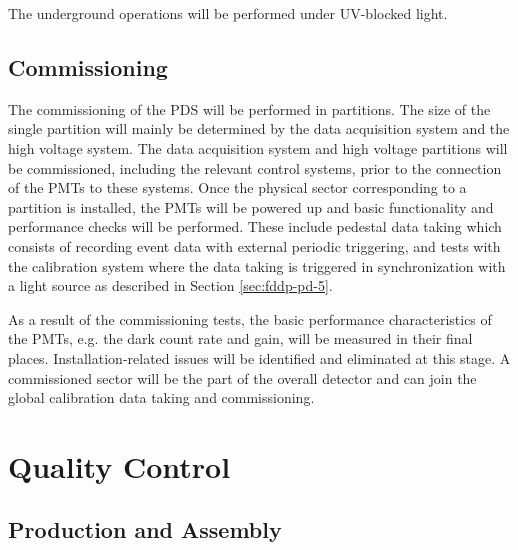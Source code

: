 The underground operations will be performed under UV-blocked light.

\subsection{Commissioning}
\label{sec:fddp-pd-9.4}

The commissioning of the PDS will be performed in partitions. The size of the single partition will mainly be determined by the data acquisition system and the high voltage system. The data acquisition system and high voltage partitions will be commissioned, including the relevant control systems, prior to the connection of the PMTs to these systems. Once the physical sector corresponding to a partition is installed, the PMTs will be powered up and basic functionality and performance checks will be performed. These include pedestal data taking which consists of recording event data with external periodic triggering, and tests with the calibration system where the data taking is triggered in synchronization with a light source as described in Section \ref{sec:fddp-pd-5}.

As a result of the commissioning tests, the basic performance characteristics of the PMTs, e.g. the dark count rate and gain, will be measured in their final places. Installation-related issues will be identified and eliminated at this stage. A commissioned sector will be the part of the overall detector and can join the global calibration data taking and commissioning.

\section{Quality Control}
\label{sec:fddp-pd-10}

 \subsection{Production and Assembly}
 \label{sec:fddp-pd-10.1}
 
